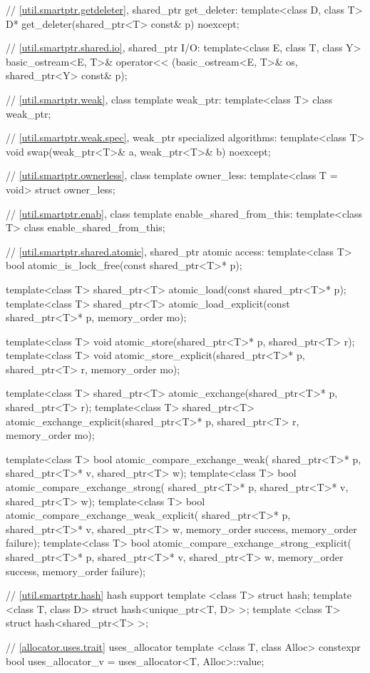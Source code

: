 \begin{codeblock}
{  // \ref{util.smartptr.getdeleter}, shared_ptr get_deleter:
  template<class D, class T> D* get_deleter(shared_ptr<T> const& p) noexcept;

  // \ref{util.smartptr.shared.io}, shared_ptr I/O:
  template<class E, class T, class Y>
    basic_ostream<E, T>& operator<< (basic_ostream<E, T>& os, shared_ptr<Y> const& p);

  // \ref{util.smartptr.weak}, class template weak_ptr:
  template<class T> class weak_ptr;

  // \ref{util.smartptr.weak.spec}, weak_ptr specialized algorithms:
  template<class T> void swap(weak_ptr<T>& a, weak_ptr<T>& b) noexcept;

  // \ref{util.smartptr.ownerless}, class template owner_less:
  template<class T = void> struct owner_less;

  // \ref{util.smartptr.enab}, class template enable_shared_from_this:
  template<class T> class enable_shared_from_this;

  // \ref{util.smartptr.shared.atomic}, shared_ptr atomic access:
  template<class T>
    bool atomic_is_lock_free(const shared_ptr<T>* p);

  template<class T>
    shared_ptr<T> atomic_load(const shared_ptr<T>* p);
  template<class T>
    shared_ptr<T> atomic_load_explicit(const shared_ptr<T>* p, memory_order mo);

  template<class T>
    void atomic_store(shared_ptr<T>* p, shared_ptr<T> r);
  template<class T>
    void atomic_store_explicit(shared_ptr<T>* p, shared_ptr<T> r, memory_order mo);

  template<class T>
    shared_ptr<T> atomic_exchange(shared_ptr<T>* p, shared_ptr<T> r);
  template<class T>
    shared_ptr<T> atomic_exchange_explicit(shared_ptr<T>* p, shared_ptr<T> r,
                                           memory_order mo);

  template<class T>
    bool atomic_compare_exchange_weak(
      shared_ptr<T>* p, shared_ptr<T>* v, shared_ptr<T> w);
  template<class T>
    bool atomic_compare_exchange_strong(
      shared_ptr<T>* p, shared_ptr<T>* v, shared_ptr<T> w);
  template<class T>
    bool atomic_compare_exchange_weak_explicit(
      shared_ptr<T>* p, shared_ptr<T>* v, shared_ptr<T> w,
      memory_order success, memory_order failure);
  template<class T>
    bool atomic_compare_exchange_strong_explicit(
      shared_ptr<T>* p, shared_ptr<T>* v, shared_ptr<T> w,
      memory_order success, memory_order failure);

  // \ref{util.smartptr.hash} hash support
  template <class T> struct hash;
  template <class T, class D> struct hash<unique_ptr<T, D> >;
  template <class T> struct hash<shared_ptr<T> >;

  // \ref{allocator.uses.trait} uses_allocator
  template <class T, class Alloc> constexpr bool uses_allocator_v
    = uses_allocator<T, Alloc>::value;
}
\end{codeblock}

